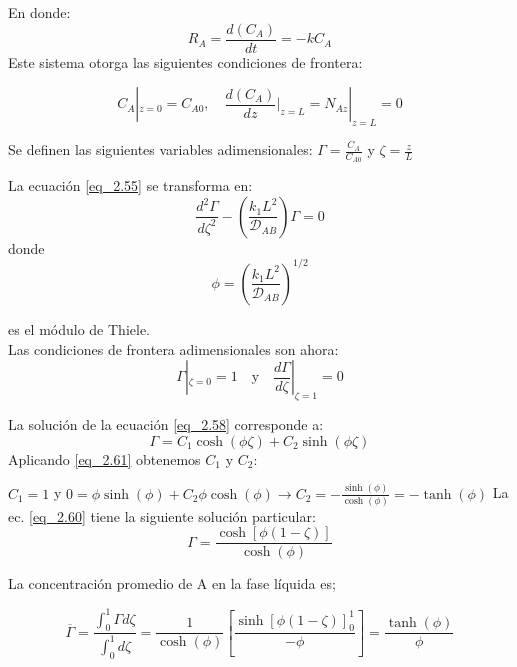 En donde:\begin{equation}
    R_A=\frac{d(C_A)}{dt}=-kC_A
    \label{eq_2.56}
\end{equation}
Este sistema otorga las siguientes condiciones de frontera:

\begin{equation}
    C_A|_{z=0} = C_{A0}, \quad \frac{d(C_A)}{dz}\bigg|_{z=L} = N_{Az}|_{z=L} = 0
    \label{eq_2.57}
\end{equation}

Se definen las siguientes variables adimensionales: $\Gamma=\frac{C_A}{C_{A0}}$ y $\zeta=\frac{z}{L}$

La ecuación \eqref{eq_2.55} se transforma en:
\begin{equation}
    \frac{d^2\Gamma}{d\zeta^2}-\left(\frac{k_1L^2}{\mathscr{D}_{AB}}\right)\Gamma=0
    \label{eq_2.58}
\end{equation}
\quad donde
\begin{equation}
  \phi=\left( \frac{k_1L^2}{\mathscr{D}_{AB}}\right)^{1/2}
\end{equation}

es el módulo de Thiele. \\Las condiciones de frontera adimensionales son ahora:
\begin{equation}
 \Gamma|_{\zeta=0}=1   
\quad \text{y} \quad
 \frac{d\Gamma}{d\zeta}|_{\zeta=1}=0   
 \label{eq_2.60}
\end{equation}

La solución de la ecuación \eqref{eq_2.58} corresponde a:
\begin{equation}
    \Gamma=C_1\cosh({\phi\zeta})+C_2\sinh({\phi\zeta})
    \label{eq_2.61}
\end{equation}
Aplicando \eqref{eq_2.61} obtenemos $C_1$ y $C_2$:

 $C_1=1$ y $0=\phi \sinh({\phi})+C_2\phi \cosh(\phi)\longrightarrow C_2=-\frac{\sinh(\phi)}{\cosh({\phi})}=-\tanh({\phi})$
La ec. \eqref{eq_2.60} tiene la siguiente solución particular:
 \begin{equation}
  \Gamma=\frac{\cosh[{\phi(1-\zeta)}]}{\cosh({\phi})}   
  \label{eq_2.62}
 \end{equation}

La concentración promedio de A en la fase líquida es;

 \begin{equation}
     \overline{\Gamma}=\frac{\int_0^1\Gamma d\zeta}{\int_0^1d\zeta}=\frac{1}{\cosh(\phi)}\left[\frac{\sinh[\phi(1-\zeta)]_{0}^1}{-\phi}\right]=\frac{\tanh(\phi)}{\phi}
     \label{eq_2.63}
 \end{equation}
 
